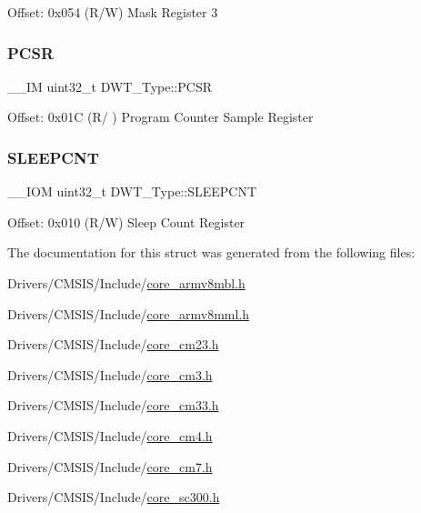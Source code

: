 Offset\+: 0x054 (R/W) Mask Register 3 \mbox{\label{struct_d_w_t___type_a6353ca1d1ad9bc1be05d3b5632960113}} 
\subsubsection{\texorpdfstring{PCSR}{PCSR}}
{\footnotesize\ttfamily \+\_\+\+\_\+\+IM uint32\+\_\+t D\+W\+T\+\_\+\+Type\+::\+P\+C\+SR}

Offset\+: 0x01C (R/ ) Program Counter Sample Register \mbox{\label{struct_d_w_t___type_a416a54e2084ce66e5ca74f152a5ecc70}} 
\subsubsection{\texorpdfstring{SLEEPCNT}{SLEEPCNT}}
{\footnotesize\ttfamily \+\_\+\+\_\+\+I\+OM uint32\+\_\+t D\+W\+T\+\_\+\+Type\+::\+S\+L\+E\+E\+P\+C\+NT}

Offset\+: 0x010 (R/W) Sleep Count Register 

The documentation for this struct was generated from the following files\+:\begin{DoxyCompactItemize}
\item 
Drivers/\+C\+M\+S\+I\+S/\+Include/\mbox{\hyperlink{core__armv8mbl_8h}{core\+\_\+armv8mbl.\+h}}\item 
Drivers/\+C\+M\+S\+I\+S/\+Include/\mbox{\hyperlink{core__armv8mml_8h}{core\+\_\+armv8mml.\+h}}\item 
Drivers/\+C\+M\+S\+I\+S/\+Include/\mbox{\hyperlink{core__cm23_8h}{core\+\_\+cm23.\+h}}\item 
Drivers/\+C\+M\+S\+I\+S/\+Include/\mbox{\hyperlink{core__cm3_8h}{core\+\_\+cm3.\+h}}\item 
Drivers/\+C\+M\+S\+I\+S/\+Include/\mbox{\hyperlink{core__cm33_8h}{core\+\_\+cm33.\+h}}\item 
Drivers/\+C\+M\+S\+I\+S/\+Include/\mbox{\hyperlink{core__cm4_8h}{core\+\_\+cm4.\+h}}\item 
Drivers/\+C\+M\+S\+I\+S/\+Include/\mbox{\hyperlink{core__cm7_8h}{core\+\_\+cm7.\+h}}\item 
Drivers/\+C\+M\+S\+I\+S/\+Include/\mbox{\hyperlink{core__sc300_8h}{core\+\_\+sc300.\+h}}\end{DoxyCompactItemize}
